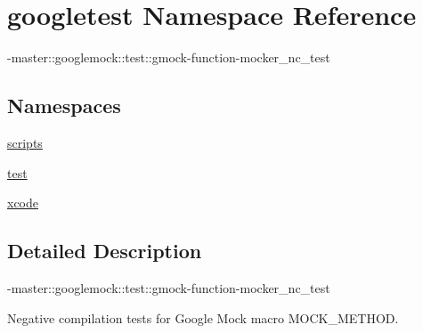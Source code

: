 \hypertarget{namespacegoogletest}{}\section{googletest Namespace Reference}
\label{namespacegoogletest}


-\/master\+::googlemock\+::test\+::gmock-\/function-\/mocker\+\_\+nc\+\_\+test  


\subsection*{Namespaces}
\begin{DoxyCompactItemize}
\item 
 \mbox{\hyperlink{namespacegoogletest_1_1scripts}{scripts}}
\item 
 \mbox{\hyperlink{namespacegoogletest_1_1test}{test}}
\item 
 \mbox{\hyperlink{namespacegoogletest_1_1xcode}{xcode}}
\end{DoxyCompactItemize}


\subsection{Detailed Description}
-\/master\+::googlemock\+::test\+::gmock-\/function-\/mocker\+\_\+nc\+\_\+test 

\begin{DoxyVerb}Negative compilation tests for Google Mock macro MOCK_METHOD.\end{DoxyVerb}
 